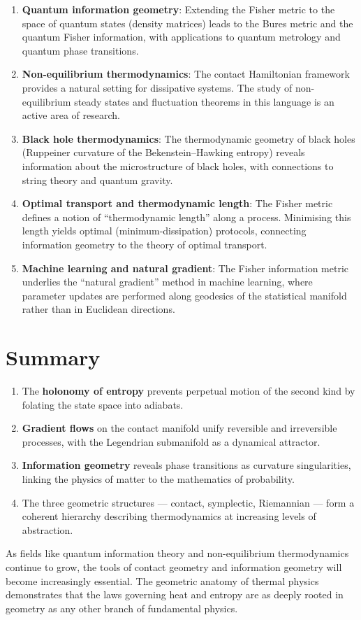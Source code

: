 \begin{enumerate}
\item \textbf{Quantum information geometry}: Extending the Fisher metric to the space of quantum states (density matrices) leads to the Bures metric and the quantum Fisher information, with applications to quantum metrology and quantum phase transitions.

\item \textbf{Non-equilibrium thermodynamics}: The contact Hamiltonian framework provides a natural setting for dissipative systems. The study of non-equilibrium steady states and fluctuation theorems in this language is an active area of research.

\item \textbf{Black hole thermodynamics}: The thermodynamic geometry of black holes (Ruppeiner curvature of the Bekenstein--Hawking entropy) reveals information about the microstructure of black holes, with connections to string theory and quantum gravity.

\item \textbf{Optimal transport and thermodynamic length}: The Fisher metric defines a notion of ``thermodynamic length'' along a process. Minimising this length yields optimal (minimum-dissipation) protocols, connecting information geometry to the theory of optimal transport.

\item \textbf{Machine learning and natural gradient}: The Fisher information metric underlies the ``natural gradient'' method in machine learning, where parameter updates are performed along geodesics of the statistical manifold rather than in Euclidean directions.
\end{enumerate}

\section{Summary}

\begin{enumerate}
\item The \textbf{holonomy of entropy} prevents perpetual motion of the second kind by folating the state space into adiabats.
\item \textbf{Gradient flows} on the contact manifold unify reversible and irreversible processes, with the Legendrian submanifold as a dynamical attractor.
\item \textbf{Information geometry} reveals phase transitions as curvature singularities, linking the physics of matter to the mathematics of probability.
\item The three geometric structures --- contact, symplectic, Riemannian --- form a coherent hierarchy describing thermodynamics at increasing levels of abstraction.
\end{enumerate}

As fields like quantum information theory and non-equilibrium thermodynamics continue to grow, the tools of contact geometry and information geometry will become increasingly essential. The geometric anatomy of thermal physics demonstrates that the laws governing heat and entropy are as deeply rooted in geometry as any other branch of fundamental physics.
